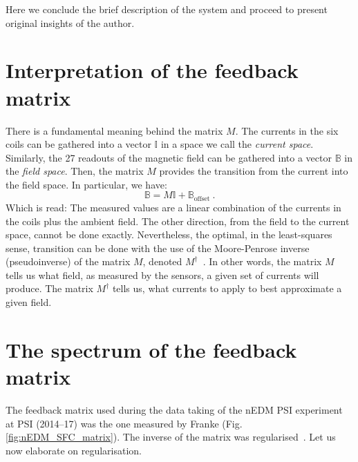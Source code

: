 Here we conclude the brief description of the system and proceed to present original insights of the author.




\section{Interpretation of the feedback matrix}
There is a fundamental meaning behind the matrix $M$. The currents in the six coils can be gathered into a vector $\mathbb{I}$ in a space we call the \emph{current space}. Similarly, the 27 readouts of the magnetic field can be gathered into a vector $\mathbb{B}$ in the \emph{field space}. Then, the matrix $M$ provides the transition from the current into the field space. In particular, we have:
\begin{equation}
  \mathbb{B} = M \mathbb{I} + \mathbb{B}_\text{offset} \ .
\end{equation}
Which is read: The measured values are a linear combination of the currents in the coils plus the ambient field.
The other direction, from the field to the current space, cannot be done exactly. Nevertheless, the optimal, in the least-squares sense, transition can be done with the use of the Moore-Penrose inverse (pseudoinverse) of the matrix $M$, denoted $M^\dagger$~\cite{penrose_1955}.
In other words, the matrix $M$ tells us what field, as measured by the sensors, a given set of currents will produce. The matrix $M^\dagger$ tells us, what currents to apply to best approximate a given field.




\section{The spectrum of the feedback matrix}
\label{sec:nedm_sfc_matrix}
The feedback matrix used during the data taking of the nEDM PSI experiment at PSI (2014--17) was the one measured by Franke (Fig.\,\ref{fig:nEDM_SFC_matrix}). The inverse of the matrix was regularised~\cite{Franke2013}. Let us now elaborate on regularisation.

